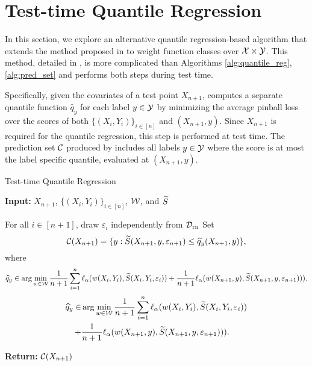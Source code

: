 \section{Test-time Quantile Regression}
\label{sec:testtimeqr}

In this section, we explore an alternative quantile regression-based algorithm that extends the method proposed in \cite{GCC2023} to weight function classes over ${\cal X} \times {\cal Y}$. This method, detailed in , is more complicated than Algorithms \ref{alg:quantile_reg}, \ref{alg:pred_set} and performs both steps during test time.

Specifically, given the covariates of a test point $X_{n+1}$,  computes a separate quantile function $\hat{q}_y$ for each label $y \in {\cal Y}$ by minimizing the average pinball loss over the scores of both $\{(X_{i},Y_{i})\}_{i \in [n]}$ and $(X_{n+1},y)$. Since $X_{n+1}$ is required for the quantile regression, this step is performed at test time. The prediction set ${\cal C}$ produced by  includes all labels $y \in {\cal Y}$ where the score is at most the label specific quantile, evaluated at $(X_{n+1},y)$.

\begin{algorithm}
\caption{Test-time Quantile Regression}
\label{alg:tt_quantile_reg}
\textbf{Input:} $X_{n+1}$, $\{(X_i,Y_i)\}_{i \in [n]}$, ${\cal W}$, and ${\widetilde{S}}$\\

\begin{algorithmic}[1]
    \STATE For all $i \in [n+1]$, draw $\varepsilon_i$ independently from ${\cal D}_{\text{rn}}$
    \STATE Set
    $$
        {\cal C}(X_{n+1}) = \{y:{\widetilde{S}}(X_{n+1},y, \varepsilon_{n+1}) \leq \widehat{q}_y(X_{n+1},y)\},
    $$
     where
     \ifarxiv
     \begin{align*}
        \widehat{q}_y \in \arg \min_{w \in {\cal W}} \frac{1}{n+1} \sum_{i=1}^n \ell_\alpha (w(X_i,Y_i),{\widetilde{S}}(X_i,Y_i, \varepsilon_i)) 
    + \frac{1}{n+1} \ell_\alpha (w(X_{n+1},y),{\widetilde{S}}(X_{n+1},y, \varepsilon_{n+1}))).
    \end{align*}
     \else
    \begin{align*}
        \widehat{q}_y \in &\arg \min_{w \in {\cal W}} \frac{1}{n+1} \sum_{i=1}^n \ell_\alpha (w(X_i,Y_i),{\widetilde{S}}(X_i,Y_i, \varepsilon_i)) \\
    + &\frac{1}{n+1} \ell_\alpha (w(X_{n+1},y),{\widetilde{S}}(X_{n+1},y, \varepsilon_{n+1}))).
    \end{align*}
    \fi
\end{algorithmic}
\textbf{Return:} ${\cal C}(X_{n+1})$
\end{algorithm}

